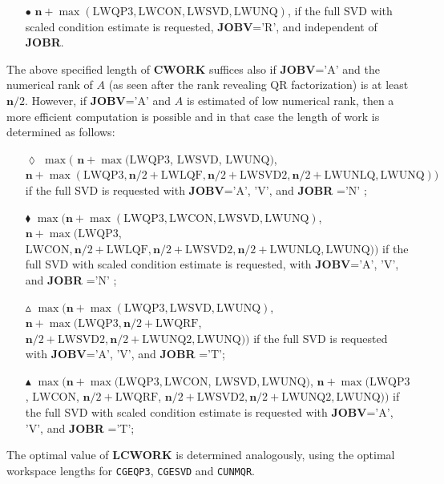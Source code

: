 \documentclass[12pt, a4paper, final]{article}
\numberwithin{equation}{section}
\begin{document}
\begin{itemize}
\begin{itemize}
\begin{itemize}
\begin{itemize}
				\item[$\bullet$] $\mathbf{n} + \max( \mbox{LWQP3}, \mbox{LWCON}, \mbox{LWSVD}, \mbox{LWUNQ} )$, if the full SVD with scaled condition estimate is requested, \textbf{JOBV}='R', and independent of \textbf{JOBR}.	
			\end{itemize}
			The above specified length of \textbf{CWORK} suffices also if \textbf{JOBV}='A' and the numerical rank of $A$ (as seen after the rank revealing QR factorization) is at least $\mathbf{n}/2$. However, if \textbf{JOBV}='A' and $A$ is estimated of low numerical rank, then a more efficient computation is possible and in that case the length of work is determined as follows:
			\begin{itemize}
				\item[$\lozenge$] $\max($ $\mathbf{n} + \max( \mbox{LWQP3}$, $\mbox{LWSVD}$, $\mbox{LWUNQ})$, $\mathbf{n} + \max( \mbox{LWQP3}, \mathbf{n}/2+\mbox{LWLQF}, \mathbf{n}/2+\mbox{LWSVD2}, \mathbf{n}/2+\mbox{LWUNLQ}, \mbox{LWUNQ}) )$ if the  
				full SVD is requested with \textbf{JOBV}='A', 'V', and \textbf{JOBR} ='N' ;
				\item[$\blacklozenge$]	 $\max(\mathbf{n} + \max( \mbox{LWQP3}, \mbox{LWCON}, \mbox{LWSVD}, \mbox{LWUNQ})$, $\mathbf{n} + \max( \mbox{LWQP3}$, $\mbox{LWCON}, \mathbf{n}/2+\mbox{LWLQF}, \mathbf{n}/2+\mbox{LWSVD2}, \mathbf{n}/2+\mbox{LWUNLQ}, \mbox{LWUNQ}) )$ if the  
				full SVD with scaled condition estimate is requested, with \textbf{JOBV}='A', 'V', and \textbf{JOBR} ='N' ;
				\item[$\vartriangle$] $\max( \mathbf{n} + \max( \mbox{LWQP3}, \mbox{LWSVD}, \mbox{LWUNQ} )$, $\mathbf{n} + \max( \mbox{LWQP3}, \mathbf{n}/2+\mbox{LWQRF}$, $\mathbf{n}/2+\mbox{LWSVD2}, \mathbf{n}/2+\mbox{LWUNQ2}, \mbox{LWUNQ} ) )$ if the
				full SVD is requested with \textbf{JOBV}='A', 'V', and \textbf{JOBR} ='T';
				\item[$\blacktriangle$] $\max( \mathbf{n} + \max( \mbox{LWQP3}, \mbox{LWCON}$, $\mbox{LWSVD}, \mbox{LWUNQ} )$, $\mathbf{n} + \max( \mbox{LWQP3}$, $\mbox{LWCON}$, $\mathbf{n}/2+\mbox{LWQRF}$, $\mathbf{n}/2+\mbox{LWSVD2}, \mathbf{n}/2+\mbox{LWUNQ2}, \mbox{LWUNQ} ) )$ if the
				full SVD with scaled condition estimate is requested with \textbf{JOBV}='A', 'V', and \textbf{JOBR} ='T';
			\end{itemize}
		\end{itemize} 	
		The optimal value of \textbf{LCWORK} is determined analogously, using the optimal workspace lengths for \texttt{CGEQP3}, \texttt{CGESVD} and \texttt{CUNMQR}.
	\end{itemize}	
	

\end{itemize}
\end{document}
